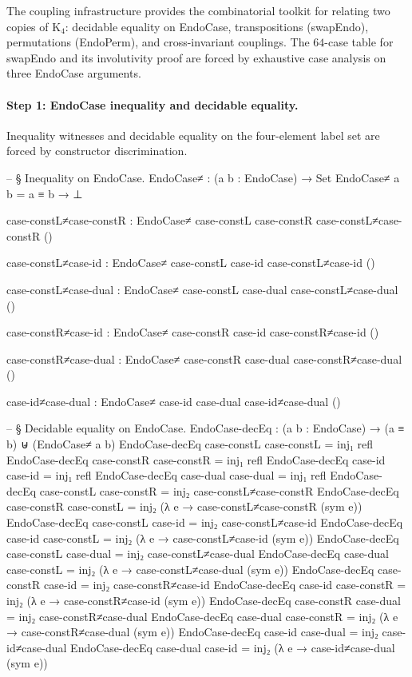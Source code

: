 \documentclass[11pt,a4paper]{book}
\def\texttt#1{#1}%
\begin{document}
The coupling infrastructure provides the combinatorial toolkit for relating two copies of
K$_4$: decidable equality on \texttt{EndoCase}, transpositions (\texttt{swapEndo}), permutations
(\texttt{EndoPerm}), and cross-invariant couplings. The $64$-case table for \texttt{swapEndo}
and its involutivity proof are forced by exhaustive case analysis on three \texttt{EndoCase}
arguments.

\paragraph{Step 1: EndoCase inequality and decidable equality.}
Inequality witnesses and decidable equality on the four-element label set are forced by constructor discrimination.

\begin{code}
-- § Inequality on EndoCase.
EndoCase≠ : (a b : EndoCase) → Set
EndoCase≠ a b = a ≡ b → ⊥

case-constL≠case-constR : EndoCase≠ case-constL case-constR
case-constL≠case-constR ()

case-constL≠case-id : EndoCase≠ case-constL case-id
case-constL≠case-id ()

case-constL≠case-dual : EndoCase≠ case-constL case-dual
case-constL≠case-dual ()

case-constR≠case-id : EndoCase≠ case-constR case-id
case-constR≠case-id ()

case-constR≠case-dual : EndoCase≠ case-constR case-dual
case-constR≠case-dual ()

case-id≠case-dual : EndoCase≠ case-id case-dual
case-id≠case-dual ()

-- § Decidable equality on EndoCase.
EndoCase-decEq : (a b : EndoCase) → (a ≡ b) ⊎ (EndoCase≠ a b)
EndoCase-decEq case-constL case-constL = inj₁ refl
EndoCase-decEq case-constR case-constR = inj₁ refl
EndoCase-decEq case-id     case-id     = inj₁ refl
EndoCase-decEq case-dual   case-dual   = inj₁ refl
EndoCase-decEq case-constL case-constR = inj₂ case-constL≠case-constR
EndoCase-decEq case-constR case-constL = inj₂ (λ e → case-constL≠case-constR (sym e))
EndoCase-decEq case-constL case-id     = inj₂ case-constL≠case-id
EndoCase-decEq case-id     case-constL = inj₂ (λ e → case-constL≠case-id (sym e))
EndoCase-decEq case-constL case-dual   = inj₂ case-constL≠case-dual
EndoCase-decEq case-dual   case-constL = inj₂ (λ e → case-constL≠case-dual (sym e))
EndoCase-decEq case-constR case-id     = inj₂ case-constR≠case-id
EndoCase-decEq case-id     case-constR = inj₂ (λ e → case-constR≠case-id (sym e))
EndoCase-decEq case-constR case-dual   = inj₂ case-constR≠case-dual
EndoCase-decEq case-dual   case-constR = inj₂ (λ e → case-constR≠case-dual (sym e))
EndoCase-decEq case-id     case-dual   = inj₂ case-id≠case-dual
EndoCase-decEq case-dual   case-id     = inj₂ (λ e → case-id≠case-dual (sym e))
\end{code}
\end{document}
